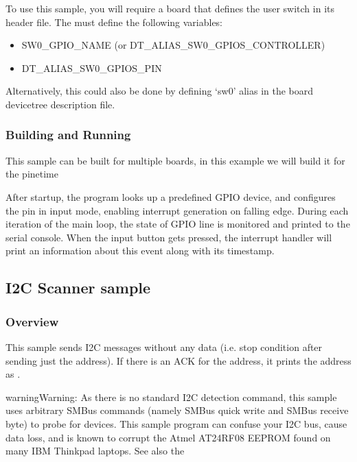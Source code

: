 \documentclass[letterpaper,10pt,english]{sphinxmanual}
\begin{document}
To use this sample, you will require a board that defines the user switch in its
header file. The  must define the following variables:
\begin{itemize}
\item {} 
SW0\_GPIO\_NAME (or DT\_ALIAS\_SW0\_GPIOS\_CONTROLLER)

\item {} 
DT\_ALIAS\_SW0\_GPIOS\_PIN

\end{itemize}

Alternatively, this could also be done by defining ‘sw0’ alias in the board
devicetree description file.


\subsubsection{Building and Running}
\label{\detokenize{samples/basic/button/README:building-and-running}}
This sample can be built for multiple boards, in this example we will build it
for the pinetime

After startup, the program looks up a predefined GPIO device, and configures the
pin in input mode, enabling interrupt generation on falling edge. During each
iteration of the main loop, the state of GPIO line is monitored and printed to
the serial console. When the input button gets pressed, the interrupt handler
will print an information about this event along with its timestamp.


\subsection{I2C Scanner sample}
\label{\detokenize{samples/basic/scani2c/README:i2c-scanner-sample}}\label{\detokenize{samples/basic/scani2c/README:i2c-scanner}}\label{\detokenize{samples/basic/scani2c/README::doc}}

\subsubsection{Overview}
\label{\detokenize{samples/basic/scani2c/README:overview}}
This sample sends I2C messages without any data (i.e. stop condition
after sending just the address). If there is an ACK for the
address, it prints the address as .

\begin{sphinxadmonition}{warning}{Warning:}
As  there  is  no  standard I2C detection command, this sample
uses arbitrary SMBus commands (namely SMBus quick write and SMBus
receive byte) to probe for devices.  This sample program can confuse
your I2C bus, cause data loss, and is known to corrupt
the Atmel AT24RF08 EEPROM found on many IBM Thinkpad laptops.
See also the 
\end{sphinxadmonition}
\end{document}
